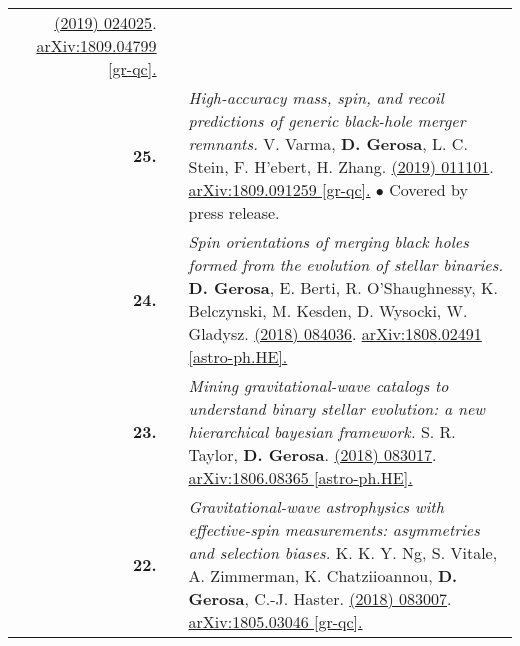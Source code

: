 {\begin{longtable}{rp{0.3cm}p{15.8cm}}
\newline{}
\href{https://journals.aps.org/prd/abstract/10.1103/PhysRevD.99.024025}{\prd 99 (2019) 024025}. \href{https://arxiv.org/abs/1809.04799}{arXiv:1809.04799 [gr-qc].}
\vspace{0.09cm}\\
%
\textbf{25.} & & \textit{High-accuracy mass, spin, and recoil predictions of generic black-hole merger remnants.}
\newline{}
V. Varma, \textbf{D. Gerosa}, L. C. Stein, F. H'ebert, H. Zhang.
\newline{}
\href{https://journals.aps.org/prl/abstract/10.1103/PhysRevLett.122.011101}{\prl 122 (2019) 011101}. \href{https://arxiv.org/abs/1809.091259}{arXiv:1809.091259 [gr-qc].}
\newline{}
\textcolor{color1}{$\bullet$} Covered by press release.
\vspace{0.09cm}\\
%
\textbf{24.} & & \textit{Spin orientations of merging black holes formed from the evolution of stellar binaries.}
\newline{}
\textbf{D. Gerosa}, E. Berti, R. O'Shaughnessy, K. Belczynski, M. Kesden, D. Wysocki, W. Gladysz.
\newline{}
\href{https://journals.aps.org/prd/abstract/10.1103/PhysRevD.98.084036}{\prd 98 (2018) 084036}. \href{https://arxiv.org/abs/1808.02491}{arXiv:1808.02491 [astro-ph.HE].}
\vspace{0.09cm}\\
%
\textbf{23.} & & \textit{Mining gravitational-wave catalogs to understand binary stellar evolution: a new hierarchical bayesian framework.}
\newline{}
S. R. Taylor, \textbf{D. Gerosa}.
\newline{}
\href{https://journals.aps.org/prd/abstract/10.1103/PhysRevD.98.083017}{\prd 98 (2018) 083017}. \href{https://arxiv.org/abs/1806.08365}{arXiv:1806.08365 [astro-ph.HE].}
\vspace{0.09cm}\\
%
\textbf{22.} & & \textit{Gravitational-wave astrophysics with effective-spin measurements: asymmetries and selection biases.}
\newline{}
K. K. Y. Ng, S. Vitale, A. Zimmerman, K. Chatziioannou, \textbf{D. Gerosa}, C.-J. Haster.
\newline{}
\href{https://journals.aps.org/prd/abstract/10.1103/PhysRevD.98.083007}{\prd 98 (2018) 083007}. \href{https://arxiv.org/abs/1805.03046}{arXiv:1805.03046 [gr-qc].}
\vspace{0.09cm}\\

\end{longtable}}

